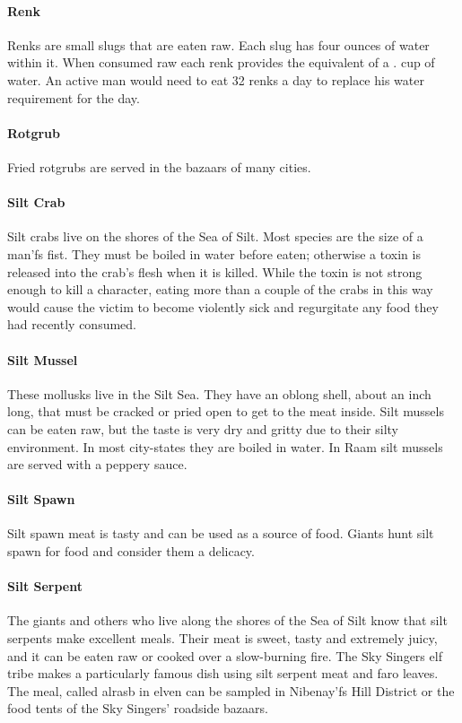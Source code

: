 \begin{multicols}{2}
\paragraph{Renk} Renks are small slugs that are eaten raw. Each slug has four ounces of water within it. When consumed raw each renk provides the equivalent of a . cup of water. An active man would need to eat 32 renks a day to replace his water requirement for the day.\\
\paragraph{Rotgrub} Fried rotgrubs are served in the bazaars of many cities.\\
\paragraph{Silt Crab} Silt crabs live on the shores of the Sea of Silt. Most species are the size of a man'fs fist. They must be boiled in water before eaten; otherwise a toxin is released into the crab's flesh when it is killed.  While the toxin is not strong enough to kill a character, eating more than a couple of the crabs in this way would cause the victim to become violently sick and regurgitate any food they had recently consumed.\\
\paragraph{Silt Mussel} These mollusks live in the Silt Sea. They have an oblong shell, about an inch long, that must be cracked or pried open to get to the meat inside. Silt mussels can be eaten raw, but the taste is very dry and gritty due to their silty environment. In most city-states they are boiled in water. In Raam silt mussels are served with a peppery sauce.\\
\paragraph{Silt Spawn} Silt spawn meat is tasty and can be used as a source of food. Giants hunt silt spawn for food and consider them a delicacy.\\
\paragraph{Silt Serpent} The giants and others who live along the shores of the Sea of Silt know that silt serpents make excellent meals. Their meat is sweet, tasty and extremely juicy, and it can be eaten raw or cooked over a slow-burning fire. The Sky Singers elf tribe makes a particularly famous dish using silt serpent meat and faro leaves. The meal, called alrasb in elven can be sampled in Nibenay'fs Hill District or the food tents of the Sky Singers' roadside bazaars.\\

\end{multicols}

